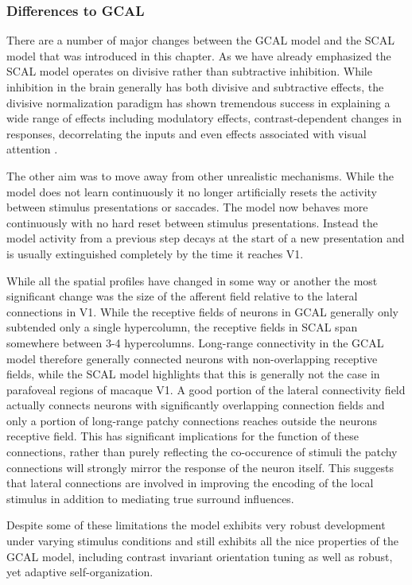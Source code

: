 \subsubsection{Differences to GCAL}

There are a number of major changes between the GCAL model and the
SCAL model that was introduced in this chapter. As we have already
emphasized the SCAL model operates on divisive rather than subtractive
inhibition. While inhibition in the brain generally has both divisive
and subtractive effects, the divisive normalization paradigm has shown
tremendous success in explaining a wide range of effects including
modulatory effects, contrast-dependent changes in responses,
decorrelating the inputs and even effects associated with visual
attention \citep{Cavanaugh2002a, Graham2011, Carandini2012,
  Reynaud2012, Coen2015}.

The other aim was to move away from other unrealistic
mechanisms. While the model does not learn continuously it no longer
artificially resets the activity between stimulus presentations or
saccades. The model now behaves more continuously with no hard reset
between stimulus presentations. Instead the model activity from a
previous step decays at the start of a new presentation and is usually
extinguished completely by the time it reaches V1.

While all the spatial profiles have changed in some way or another the
most significant change was the size of the afferent field relative to
the lateral connections in V1. While the receptive fields of neurons
in GCAL generally only subtended only a single hypercolumn, the
receptive fields in SCAL span somewhere between 3-4
hypercolumns. Long-range connectivity in the GCAL model therefore
generally connected neurons with non-overlapping receptive fields,
while the SCAL model highlights that this is generally not the case in
parafoveal regions of macaque V1. A good portion of the lateral
connectivity field actually connects neurons with significantly
overlapping connection fields and only a portion of long-range patchy
connections reaches outside the neurons receptive field. This has
significant implications for the function of these connections, rather
than purely reflecting the co-occurence of stimuli the patchy
connections will strongly mirror the response of the neuron
itself. This suggests that lateral connections are involved in
improving the encoding of the local stimulus in addition to mediating
true surround influences.

Despite some of these limitations the model exhibits very robust
development under varying stimulus conditions and still exhibits all
the nice properties of the GCAL model, including contrast invariant
orientation tuning as well as robust, yet adaptive self-organization.

